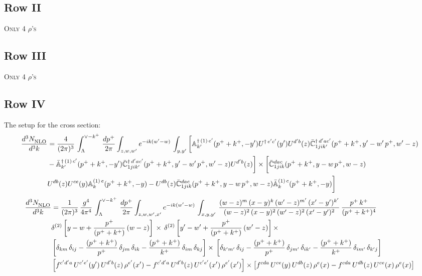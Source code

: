 \documentclass[9pt]{article}
\def\mf#1{\mathbb{#1}}
\numberwithin{equation}{section}
\begin{document}
\subsection{Row II\,}
\textsc{Only 4 $\rho$'s}
\subsection{Row III\,}
\textsc{Only 4 $\rho$'s}
\subsection{Row IV\,}
The setup for the cross section: 
\begin{align}
    \frac{d^{3}N_{\rm NLO}^{\rm}}{d^{3}k}  & = \frac{4}{(2\pi)^{3}}\,\int_{\Lambda}^{\vee-k^{+}}\, \frac{dp^{+}}{2\pi}\int_{z,w,w^{\prime}} e^{-ik(w^{\prime}-w)}\,  \int_{y,y^{\prime}}\bigg[\mf{A}^{\dagger\, (1)\,e^{\prime}}_{k^{\prime}}(p^{+}+k^{+},-y^{\prime})U^{\dagger\, e^{\prime}c^{\prime}}(y^{\prime})U^{d^{\prime}b}(z) \Bar{\mf{C}}^{\dagger\, d^{\prime}ac^{\prime}}_{1jik^{\prime}}(p^{+}+k^{+},y^{\prime}-w^{\prime}\, p^{+},w^{\prime}-z) \notag \\ &  -\Bar{\mf{A}}^{\dagger\, (1)\,c^{\prime}}_{k^{\prime}}(p^{+}+k^{+},-y^{\prime}) \Bar{\mf{C}}^{\dagger\, d^{\prime}ac^{\prime}}_{1jik^{\prime}}(p^{+}+k^{+},y^{\prime}-w^{\prime}\, p^{+},w^{\prime}-z)U^{d^{\prime}b}(z)\bigg]\times\bigg[\Bar{\mf{C}}^{dac}_{1jik}(p^{+}+k^{+},y-w\, p^{+},w-z)\notag \\ & U^{db}(z)U^{ce}(y) \mf{A}^{(1)\,e}_{k}(p^{+}+k^{+},-y) -U^{db}(z) \Bar{\mf{C}}^{dac}_{1jik}(p^{+}+k^{+},y-w\, p^{+},w-z)\Bar{\mf{A}}^{(1)\,c}_{k}(p^{+}+k^{+},-y)\bigg]\nonumber
\end{align}
\begin{align}
     \frac{d^{3}N_{\rm NLO}^{\rm}}{d^{3}k}  & = \frac{1}{(2\pi)^{3}}\,\frac{g^{4}}{4\pi^{4}}\,\int_{\Lambda}^{\vee-k^{+}}\, \frac{dp^{+}}{2\pi}\int_{z,w,w^{\prime},x'} e^{-ik(w^{\prime}-w)}\,  \int_{x,y,y^{\prime}}\,\frac{(w-z)^{m}\,(x-y)^{k}\,(w'-z)^{m'}\,(x'-y')^{k'}}{(w-z)^{2}\,(x-y)^{2}\,(w'-z)^{2}\,(x'-y')^{2}}\,\frac{p^{+}\,k^{+}}{(p^{+}+k^{+})^{4}}\notag \\ & \delta^{(2)}\left[y-w+\frac{p^{+}}{(p^{+}+k^{+})}\,(w-z)\right]\,\times\, \delta^{(2)}\left[y'-w'+\frac{p^{+}}{(p^{+}+k^{+})}\,(w'-z)\right]\times\notag \\ &  \left[\delta_{km}\,\delta_{ij}-\frac{(p^{+}+k^{+})}{p^{+}}\,\delta_{jm}\,\delta_{ik}-\frac{(p^{+}+k^{+})}{k^{+}}\,\delta_{im}\,\delta_{kj}\right]\times\, \left[\delta_{k'm'}\,\delta_{ij}-\frac{(p^{+}+k^{+})}{p^{+}}\,\delta_{jm'}\,\delta_{ik'}-\frac{(p^{+}+k^{+})}{k^{+}}\,\delta_{im'}\,\delta_{k'j}\right]\notag \\ & \left[f^{c'd'a}\,U^{c'e'}(y')\,U^{d'b}(z)\,\rho^{e'}(x')-f^{c'd'a}\, 
    U^{d'b}(z)\,U^{c'e'}(x')\,\rho^{e'}(x')\right]\times \left[f^{cda}\,U^{ce}(y)\,U^{db}(z)\,\rho^{e}(x)-f^{cda}\, 
    U^{db}(z)\,U^{ce}(x)\,\rho^{e}(x)\right]
\end{align}
\end{document}
